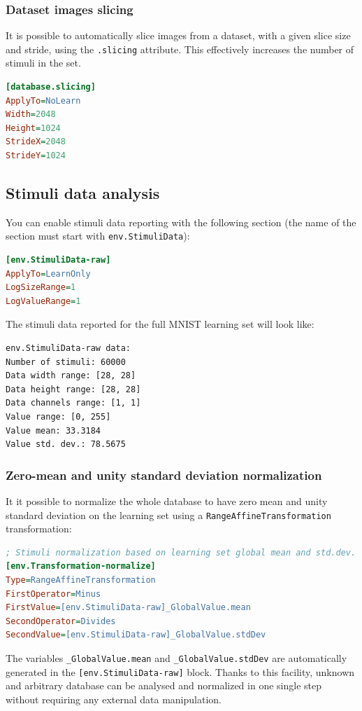 \documentclass[a4paper,11pt,oneside]{article}
\begin{document}
\subsubsection{Dataset images slicing}

It is possible to automatically slice images from a dataset, with a given slice
 size and stride, using the \lstinline!.slicing! attribute. This effectively
 increases the number of stimuli in the set.

\begin{lstlisting}[language=ini]
[database.slicing]
ApplyTo=NoLearn
Width=2048
Height=1024
StrideX=2048
StrideY=1024
\end{lstlisting}

\subsection{Stimuli data analysis}

You can enable stimuli data reporting with the following section (the name of
the section must start with \lstinline!env.StimuliData!):
\begin{lstlisting}[language=ini]
[env.StimuliData-raw]
ApplyTo=LearnOnly
LogSizeRange=1
LogValueRange=1
\end{lstlisting}

The stimuli data reported for the full MNIST learning set will look like:
\begin{lstlisting}[style=console]
env.StimuliData-raw data:
Number of stimuli: 60000
Data width range: [28, 28]
Data height range: [28, 28]
Data channels range: [1, 1]
Value range: [0, 255]
Value mean: 33.3184
Value std. dev.: 78.5675
\end{lstlisting}

\subsubsection{Zero-mean and unity standard deviation normalization}

It it possible to normalize the whole database to have zero mean and unity
standard deviation on the learning set using a
\lstinline!RangeAffineTransformation! transformation:
\begin{lstlisting}[language=ini]
; Stimuli normalization based on learning set global mean and std.dev.
[env.Transformation-normalize]
Type=RangeAffineTransformation
FirstOperator=Minus
FirstValue=[env.StimuliData-raw]_GlobalValue.mean
SecondOperator=Divides
SecondValue=[env.StimuliData-raw]_GlobalValue.stdDev
\end{lstlisting}
The variables \lstinline!_GlobalValue.mean! and \lstinline!_GlobalValue.stdDev!
are automatically generated in the \lstinline![env.StimuliData-raw]! block.
Thanks to this facility, unknown and arbitrary database can be analysed and
normalized in one single step without requiring any external data manipulation.
\end{document}
